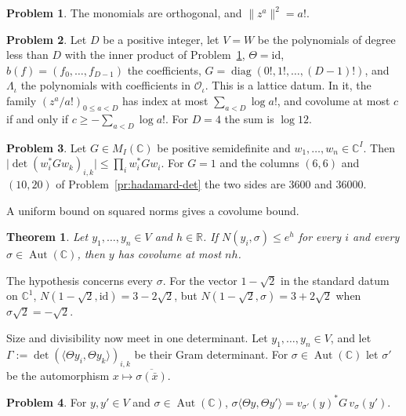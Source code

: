 \documentclass[reqno]{amsart}
\theoremstyle{definition}
\newtheorem{problem}{Problem}[section]
\theoremstyle{plain}
\newtheorem{theorem}{Theorem}[section]
\newcommand{\R}{\mathbb{R}}
\newcommand{\C}{\mathbb{C}}
\newcommand{\Oc}{\mathcal{O}}
\newcommand{\Aut}{\operatorname{Aut}}
\begin{document}
\begin{problem}\label{pr:fock}
The monomials are orthogonal, and \(\lVert z^a \rVert^2 = a!\).
\end{problem}

\begin{problem}\label{pr:fock-datum}
Let \(D\) be a positive integer, let \(V = W\) be the polynomials of degree less than \(D\) with the inner product of Problem~\ref{pr:fock}, \(\Theta = \mathrm{id}\), \(b(f) = (f_0, \dots, f_{D-1})\) the coefficients, \(G = \operatorname{diag}(0!, 1!, \dots, (D-1)!)\), and \(\Lambda_\iota\) the polynomials with coefficients in \(\Oc_\iota\).  This is a lattice datum.  In it, the family \((z^a/a!)_{0 \le a < D}\) has index at most \(\sum_{a < D} \log a!\), and covolume at most \(c\) if and only if \(c \ge -\sum_{a < D} \log a!\).  For \(D = 4\) the sum is \(\log 12\).
\end{problem}

\begin{problem}\label{pr:hadamard-gram}
Let \(G \in M_I(\C)\) be positive semidefinite and \(w_1, \dots, w_n \in \C^I\).  Then \(\lvert \det(w_i^* G w_k)_{i,k} \rvert \le \prod_i w_i^* G w_i\).  For \(G = 1\) and the columns \((6, 6)\) and \((10, 20)\) of Problem~\ref{pr:hadamard-det} the two sides are \(3600\) and \(36000\).
\end{problem}

A uniform bound on squared norms gives a covolume bound.

\begin{theorem}\label{thm:hadamard}
Let \(y_1, \dots, y_n \in V\) and \(h \in \R\).  If \(N(y_i, \sigma) \le e^h\) for every \(i\) and every \(\sigma \in \Aut(\C)\), then \(y\) has covolume at most \(nh\).
\end{theorem}

The hypothesis concerns every \(\sigma\).  For the vector \(1 - \sqrt 2\) in the standard datum on \(\C^1\), \(N(1 - \sqrt 2, \mathrm{id}) = 3 - 2\sqrt 2\), but \(N(1 - \sqrt 2, \sigma) = 3 + 2\sqrt 2\) when \(\sigma\sqrt 2 = -\sqrt 2\).

Size and divisibility now meet in one determinant.  Let \(y_1, \dots, y_n \in V\), and let \(\Gamma := \det(\langle \Theta y_i, \Theta y_k \rangle)_{i,k}\) be their Gram determinant.  For \(\sigma \in \Aut(\C)\) let \(\sigma'\) be the automorphism \(x \mapsto \overline{\sigma(\bar x)}\).

\begin{problem}\label{pr:conj-gram}
For \(y, y' \in V\) and \(\sigma \in \Aut(\C)\), \(\sigma\langle \Theta y, \Theta y' \rangle = v_{\sigma'}(y)^* G\, v_\sigma(y')\).
\end{problem}
\end{document}
